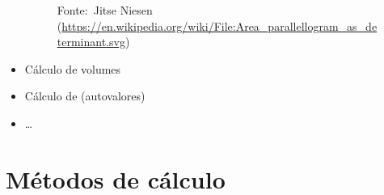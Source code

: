 \documentclass[pdftex, brazil, aspectratio=169]{beamer}
\begin{document}
\begin{frame}[t]
\begin{itemize}
{\begin{figure}[H]
\begin{center}
          \footnotesize{Fonte:~Jitse Niesen\\ \tiny{(\url{https://en.wikipedia.org/wiki/File:Area\_parallellogram\_as\_determinant.svg})}}
        \end{center}
      \end{figure}}
    \item Cálculo de volumes
    \item Cálculo de  (autovalores)
    \item \ldots
  \end{itemize}
\end{frame}

\section{Métodos de cálculo}
\end{document}
